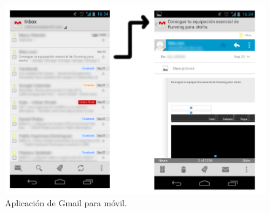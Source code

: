 \begin{itemize}
\begin{figure}
  \centering
    \includegraphics[scale=0.4]{./Android/imagenes/gmailMovil.png}
  \caption{Aplicación de Gmail para móvil.}
  \label{fig:gmailMovil}
\end{figure}


\end{itemize}
